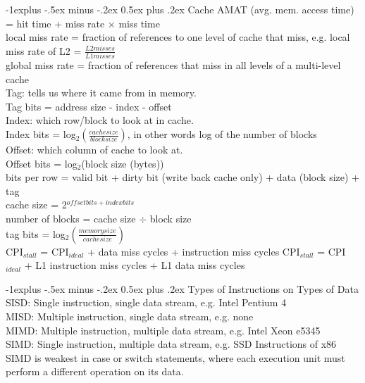 \documentclass[10pt,landscape]{article}
\makeatletter
\renewcommand{\subsection}{\@startsection{subsection}{2}{0mm}%
                                {-1explus -.5ex minus -.2ex}%
                                {0.5ex plus .2ex}%
                                {\normalfont\normalsize\bfseries}}
\makeatother
\begin{document}
\begin{multicols}{3}
\subsection{Cache}
AMAT (avg. mem. access time) = hit time + miss rate $\times$ miss time \\ 
local miss rate = fraction of references to one level of cache that miss, e.g. local miss rate of L2 = $\frac{L2 misses}{L1 misses}$\\
global miss rate = fraction of references that miss in all levels of a multi-level cache\\
Tag: tells us where it came from in memory. \\
Tag bits = address size - index - offset \\
Index: which row/block to look at in cache. \\
Index bits = log$_{2}(\frac{cache size}{block size})$, in other words log of the number of blocks \\
Offset: which column of cache to look at. \\
Offset bits = log$_{2}$(block size (bytes))\\
bits per row = valid bit + dirty bit (write back cache only) + data (block size) + tag \\
cache size = 2$^{offset bits + index bits}$\\
number of blocks = cache size $\div$ block size \\
tag bits = log$_{2}(\frac{memory size}{cache size})$\\
CPI$_{stall}$ = CPI$_{ideal}$ + data miss cycles + instruction miss cycles
CPI$_{stall}$ = CPI$_{ideal}$ + L1 instruction miss cycles + L1 data miss cycles


\subsection{Types of Instructions on Types of Data}
SISD: Single instruction, single data stream, e.g. Intel Pentium 4\\
MISD: Multiple instruction, single data stream, e.g. none\\
MIMD: Multiple instruction, multiple data stream, e.g. Intel Xeon e5345\\
SIMD: Single instruction, multiple data stream, e.g. SSD Instructions of x86\\
SIMD is weakest in case or switch statements, where each execution unit must perform a different operation on its data. \\


\end{multicols}
\end{document}
